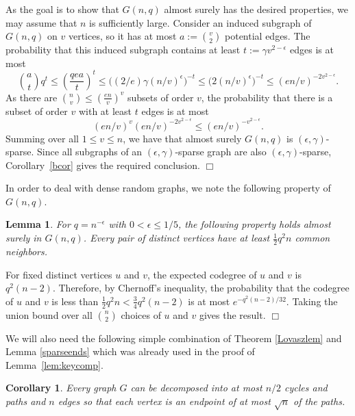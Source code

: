 \documentclass[11pt]{article}
\newtheorem{lemma}[theorem]{Lemma}
\newtheorem{corollary}[theorem]{Corollary}
\newenvironment{proof}
      {\medskip\noindent{\bf Proof:}\hspace{1mm}}
      {\hfill$\Box$\medskip}
\begin{document}
\begin{proof}
As the goal is to show that $G(n,q)$ almost surely has the desired properties, we may assume that $n$ is sufficiently large. Consider an induced subgraph of $G(n,q)$ on $v$ vertices, so it has at most $a:={v \choose 2}$ potential edges. The probability that this induced subgraph contains at least $t:=\gamma v^{2-\epsilon}$ edges is at most
$${a \choose t}q^{t} \leq \left(\frac{qea}{t}\right)^{t} \leq \big((2/e)\gamma (n/v)^{\epsilon}\big)^{-t} \leq \big(2 (n/v)^{\epsilon}\big)^{-t} \leq (en/v)^{-2v^{2-\epsilon}}.$$
As there are ${n \choose v} \leq \left(\frac{en}{v}\right)^v$ subsets of order $v$, the probability that there is a subset of order $v$ with at least $t$ edges is at most $$ \left(en/v\right)^v  \left(en/v\right)^{-2 v^{2-\epsilon}} \leq  \left(en/v\right)^{-v^{2-\epsilon}} .$$
Summing over all $1 \leq v \leq n$, we have that almost surely $G(n,q)$ is $(\epsilon,\gamma)$-sparse. Since all subgraphs of an $(\epsilon, \gamma)$-sparse graph are also $(\epsilon, \gamma)$-sparse, Corollary~\ref{bcor} gives the required conclusion.
\end{proof}

In order to deal with dense random graphs, we note the following property of $G(n, q)$.

\begin{lemma}\label{lemcodeg}
For $q = n^{-\epsilon}$ with $0 < \epsilon \leq 1/5$, the following property holds almost surely in $G(n,q)$. Every pair of distinct vertices have at least $\frac{1}{2} q^2 n$ common neighbors.
\end{lemma}

\begin{proof}
For fixed distinct vertices $u$ and $v$, the expected codegree of $u$ and $v$ is $q^2(n-2)$. Therefore, by Chernoff's inequality, the probability that the codegree of $u$ and $v$ is less than $\frac{1}{2} q^2 n < \frac{3}{4} q^2 (n-2)$ is at most $e^{-q^2 (n -2)/32}$. Taking the union bound over all $\binom{n}{2}$ choices of $u$ and $v$ gives the result.
\end{proof}

We will also need the following simple combination of Theorem \ref{Lovaszlem} and Lemma \ref{sparseends} which was already used in the proof of Lemma~\ref{lem:keycomp}.

\begin{corollary}\label{corobv}
Every graph $G$ can be decomposed into at most $n/2$ cycles and paths and $n$ edges so that each vertex is an endpoint of at most $\sqrt{n}$ of the paths.
\end{corollary}
\end{document}
